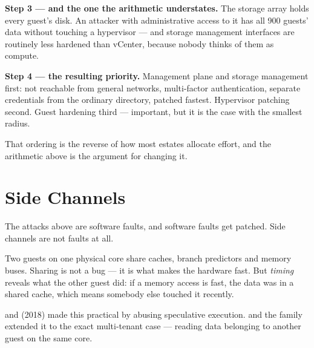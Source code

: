 \begin{worked}
\smallskip
\textbf{Step 3 --- and the one the arithmetic understates.} The storage array
holds every guest's disk. An attacker with administrative access to it has all
900 guests' data without touching a hypervisor --- and storage management
interfaces are routinely less hardened than vCenter, because nobody thinks of
them as compute.

\smallskip
\textbf{Step 4 --- the resulting priority.} Management plane and storage
management first: not reachable from general networks, multi-factor
authentication, separate credentials from the ordinary directory, patched
fastest. Hypervisor patching second. Guest hardening third --- important, but
it is the case with the smallest radius.

\smallskip
That ordering is the reverse of how most estates allocate effort, and the
arithmetic above is the argument for changing it.
\end{worked}

\section{Side Channels}

The attacks above are software faults, and software faults get patched. Side
channels are not faults at all.

Two guests on one physical core share caches, branch predictors and memory
buses. Sharing is not a bug --- it is what makes the hardware fast. But
\emph{timing} reveals what the other guest did: if a memory access is fast, the
data was in a shared cache, which means somebody else touched it recently.

 and  (2018) made this practical by abusing
speculative execution.  and the  family extended it to the
exact multi-tenant case --- reading data belonging to another guest on the same
core.

